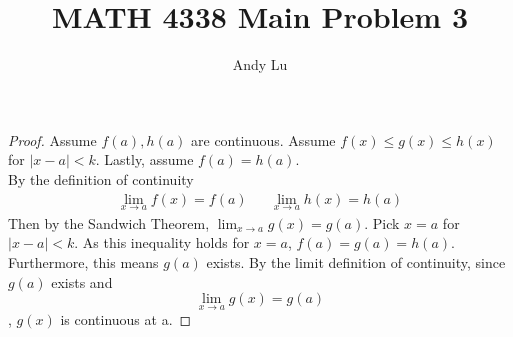 \documentclass{article}
\title{MATH 4338 Main Problem 3}
\date{}
\author{Andy Lu}
\begin{document}
  \maketitle
  \begin{proof}
    Assume $f(a), h(a)$ are continuous. Assume $f(x) \leq g(x) \leq h(x)$ for 
    $|x-a| < k$. Lastly, assume $f(a) = h(a)$. \\
    
    By the definition of continuity
    \begin{align*}
      & & \lim_{x \rightarrow a} f(x) = f(a) & 
      & \lim_{x \rightarrow a} h(x) = h(a) & &
    \end{align*}
    Then by the Sandwich Theorem, $\lim_{x \rightarrow a} g(x) = g(a)$.
    Pick $x = a$ for $|x-a| < k$. As this inequality holds for $x=a$,
    $f(a) = g(a) = h(a)$. Furthermore, this means $g(a)$ exists. By the limit 
    definition of continuity, since $g(a)$ exists and 
    $$\lim_{x \rightarrow a} g(x) = g(a)$$, $g(x)$ is continuous at a.
  \end{proof}
\end{document}
